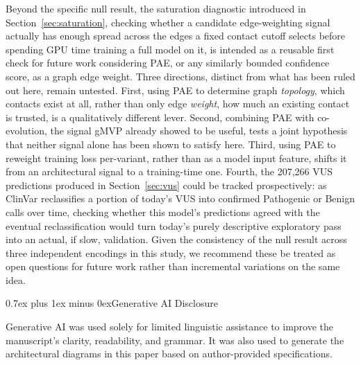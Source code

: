 \documentclass[10pt,conference,a4paper]{IEEEtran}
\makeatletter
\def\section{\@startsection{section}{1}{\z@}{1.5ex plus 1.5ex minus 0.5ex}%
{0.7ex plus 1ex minus 0ex}{\normalfont\normalsize\bfseries\centering}}%
\makeatother
\begin{document}
Beyond the specific null result, the saturation diagnostic introduced in Section~\ref{sec:saturation}, checking whether a candidate edge-weighting signal actually has enough spread across the edges a fixed contact cutoff selects before spending GPU time training a full model on it, is intended as a reusable first check for future work considering PAE, or any similarly bounded confidence score, as a graph edge weight. Three directions, distinct from what has been ruled out here, remain untested. First, using PAE to determine graph \textit{topology}, which contacts exist at all, rather than only edge \textit{weight}, how much an existing contact is trusted, is a qualitatively different lever. Second, combining PAE with co-evolution, the signal gMVP already showed to be useful, tests a joint hypothesis that neither signal alone has been shown to satisfy here. Third, using PAE to reweight training loss per-variant, rather than as a model input feature, shifts it from an architectural signal to a training-time one. Fourth, the 207,266 VUS predictions produced in Section~\ref{sec:vus} could be tracked prospectively: as ClinVar reclassifies a portion of today's VUS into confirmed Pathogenic or Benign calls over time, checking whether this model's predictions agreed with the eventual reclassification would turn today's purely descriptive exploratory pass into an actual, if slow, validation. Given the consistency of the null result across three independent encodings in this study, we recommend these be treated as open questions for future work rather than incremental variations on the same idea.

\section{Generative AI Disclosure}

Generative AI was used solely for limited linguistic assistance to improve the manuscript's clarity, readability, and grammar. It was also used to generate the architectural diagrams in this paper based on author-provided specifications.



\end{document}
